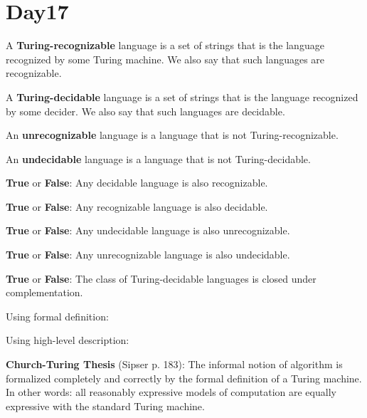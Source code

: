 \documentclass[12pt, oneside]{article}
\begin{document}
 \vfill
\section*{Day17}




A {\bf Turing-recognizable} language is a set of strings that 
is the language recognized by some Turing machine. We also 
say that such languages are recognizable.

A {\bf Turing-decidable} language is a set of strings that 
is the language recognized by some decider. We also 
say that such languages are decidable.


An {\bf unrecognizable} language is a language that is not Turing-recognizable.

An {\bf undecidable} language is a language that is not Turing-decidable.

\vfill

{\bf  True} or {\bf False}: Any  decidable language  is  also  recognizable.

\vfill

{\bf  True} or {\bf False}: Any  recognizable language  is  also  decidable.

\vfill

{\bf  True} or {\bf False}: Any  undecidable language  is  also  unrecognizable.

\vfill

{\bf  True} or {\bf False}: Any  unrecognizable language  is  also  undecidable.

\vfill

\newpage


{\bf True} or {\bf False}: The class of Turing-decidable languages is closed under complementation.

\vfill

Using formal definition:
\vfill

Using high-level description:
\vfill


{\bf  Church-Turing Thesis} (Sipser p. 183): The informal notion of algorithm is formalized completely  and correctly by the 
formal definition of a  Turing machine. In other words: all reasonably expressive models of 
computation are equally expressive with the standard Turing machine.
 \vfill
\end{document}
